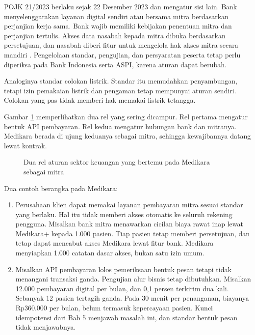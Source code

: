 POJK 21/2023 berlaku sejak 22 Desember 2023 dan mengatur sisi lain. Bank menyelenggarakan layanan digital sendiri atau
bersama mitra berdasarkan perjanjian kerja sama. Bank wajib memiliki kebijakan penentuan mitra dan perjanjian
tertulis. Akses data nasabah kepada mitra dibuka berdasarkan persetujuan, dan nasabah diberi fitur untuk mengelola hak
akses mitra secara mandiri \cite{pojk21-2023}. Pengelolaan standar, pengujian, dan persyaratan peserta tetap perlu
diperiksa pada Bank Indonesia serta ASPI, karena aturan dapat berubah.

Analoginya standar colokan listrik. Standar itu memudahkan penyambungan, tetapi izin pemakaian listrik dan pengaman
tetap mempunyai aturan sendiri. Colokan yang pas tidak memberi hak memakai listrik tetangga.

Gambar \ref{fig:ch07-rantai} memperlihatkan dua rel yang sering dicampur. Rel pertama mengatur bentuk API pembayaran.
Rel kedua mengatur hubungan bank dan mitranya. Medikara berada di ujung keduanya sebagai mitra, sehingga kewajibannya
datang lewat kontrak.

\begin{figure}[!htb]
  \centering
  
  \caption{Dua rel aturan sektor keuangan yang bertemu pada Medikara sebagai mitra}
  \label{fig:ch07-rantai}
\end{figure}

Dua contoh berangka pada Medikara:
\begin{enumerate}
  \item Perusahaan klien dapat memakai layanan pembayaran mitra sesuai standar yang berlaku. Hal itu tidak memberi
        akses otomatis ke seluruh rekening pengguna. Misalkan bank mitra menawarkan cicilan biaya rawat inap lewat
        Medikara+ kepada 1.000 pasien. Tiap pasien tetap memberi persetujuan, dan tetap dapat mencabut akses Medikara
        lewat fitur bank. Medikara menyiapkan 1.000 catatan dasar akses, bukan satu izin umum.
  \item Misalkan API pembayaran lolos pemeriksaan bentuk pesan tetapi tidak menangani transaksi ganda. Pengujian alur
        bisnis tetap dibutuhkan. Misalkan 12.000 pembayaran digital per bulan, dan 0,1 persen terkirim dua kali.
        Sebanyak 12 pasien tertagih ganda. Pada 30 menit per penanganan, biayanya Rp360.000 per bulan, belum termasuk
        kepercayaan pasien. Kunci idempotensi dari Bab 5 menjawab masalah ini, dan standar bentuk pesan tidak
        menjawabnya.
\end{enumerate}

